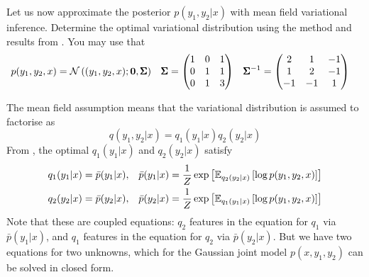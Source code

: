 \begin{exenumerate}
  Let us now approximate the posterior $p(y_1, y_2 | x)$ with mean
  field variational inference. Determine the optimal variational
  distribution using the method and results from . You may use that
  \begin{align}
    p(y_1, y_2, x) &= \mathcal{N}\left( (y_1, y_2, x); \boldsymbol{0}, \pmb{\Sigma} \right) &  \pmb{\Sigma} &= \begin{pmatrix} 
      1 & 0 & 1\\
      0 & 1 & 1\\
      0 & 1 & 3
    \end{pmatrix}
    &
    \pmb{\Sigma}^{-1} &= \begin{pmatrix} 
      2 & 1 & -1\\
      1 & 2 & -1\\
      -1 & -1 & 1
    \end{pmatrix}
  \end{align}
  
  \begin{solution}
    The mean field assumption means that the variational distribution is assumed to factorise as
    \begin{equation}
      q(y_1, y_2 | x) = q_1(y_1 | x) q_2(y_2 | x)
    \end{equation}
    From , the optimal $q_1(y_1|x)$ and $q_2(y_2|x)$ satisfy
     \begin{align}
       q_1(y_1|x) &=  \bar{p}(y_1|x), &  \bar{p}(y_1|x) &= \frac{1}{Z} \exp\left[ \mathbb{E}_{q_2(y_2|x)}\left[ \log p(y_1, y_2, x)\right] \right]\\
       q_2(y_2|x) &=  \bar{p}(y_2|x), &  \bar{p}(y_2|x) &= \frac{1}{Z} \exp\left[ \mathbb{E}_{q_1(y_1|x)}\left[ \log p(y_1, y_2, x)\right] \right]
     \end{align}
    Note that these are coupled equations: $q_2$ features in the
    equation for $q_1$ via $\bar{p}(y_1|x)$, and $q_1$ features in
    the equation for $q_2$ via $\bar{p}(y_2|x)$. But we have two
    equations for two unknowns, which for the Gaussian joint model
    $p(x, y_1, y_2)$ can be solved in closed form.


\end{solution}
\end{exenumerate}
